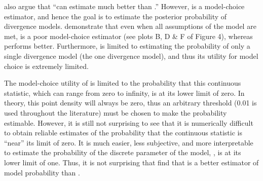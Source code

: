 \citet{Hickerson2013} also argue that ``\msb can estimate \vmratio{} much
better than \numt{}.''
However, \msb is a model-choice estimator, and hence the goal is to estimate the
posterior probability of divergence models.
\citet{Oaks2012} demonstrate that even when all assumptions of the model are
met, \vmratio is a poor model-choice estimator (see plots B, D \& F of Figure
4), whereas \numt{} performs better.
Furthermore, \vmratio{} is limited to estimating the probability of only a
single divergence model (the one divergence model), and thus its utility for
model choice is extremely limited.

The model-choice utility of \vmratio{} is limited to the probability that
this continuous statistic, which can range from zero to infinity, is at its lower
limit of zero. In theory, this point density will always be zero, thus an
arbitrary threshold (0.01 is used throughout the \msb literature) must 
be chosen to make the probability estimable.
However, it is still not surprising to see that it is numerically difficult to
obtain reliable estimates of the probability that the continuous \vmratio{}
statistic is ``near'' its limit of zero.
It is much easier, less subjective, and more interpretable to estimate
the probability of the discrete parameter of the model, \numt{}, is
at its lower limit of one.
Thus, it is not surprising that \citet{Oaks2012} find that \numt{} is a better
estimator of model probability than \vmratio{}.

